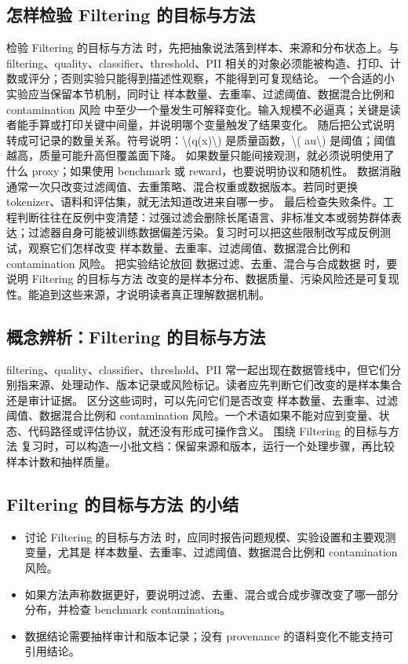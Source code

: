 \documentclass[a4paper]{article}
\begin{document}
\subsection{怎样检验 Filtering 的目标与方法}
检验 Filtering 的目标与方法 时，先把抽象说法落到样本、来源和分布状态上。与 filtering、quality、classifier、threshold、PII 相关的对象必须能被构造、打印、计数或评分；否则实验只能得到描述性观察，不能得到可复现结论。
一个合适的小实验应当保留本节机制，同时让 样本数量、去重率、过滤阈值、数据混合比例和 contamination 风险 中至少一个量发生可解释变化。输入规模不必逼真；关键是读者能手算或打印关键中间量，并说明哪个变量触发了结果变化。
随后把公式说明转成可记录的数量关系。符号说明：\textbackslash{}(q(x)\textbackslash{}) 是质量函数，\textbackslash{}( au\textbackslash{}) 是阈值；阈值越高，质量可能升高但覆盖面下降。 如果数量只能间接观测，就必须说明使用了什么 proxy；如果使用 benchmark 或 reward，也要说明协议和随机性。
数据消融通常一次只改变过滤阈值、去重策略、混合权重或数据版本。若同时更换 tokenizer、语料和评估集，就无法知道改进来自哪一步。
最后检查失败条件。工程判断往往在反例中变清楚：过强过滤会删除长尾语言、非标准文本或弱势群体表达；过滤器自身可能被训练数据偏差污染。复习时可以把这些限制改写成反例测试，观察它们怎样改变 样本数量、去重率、过滤阈值、数据混合比例和 contamination 风险。
把实验结论放回 数据过滤、去重、混合与合成数据 时，要说明 Filtering 的目标与方法 改变的是样本分布、数据质量、污染风险还是可复现性。能追到这些来源，才说明读者真正理解数据机制。
\subsection{概念辨析：Filtering 的目标与方法}
filtering、quality、classifier、threshold、PII 常一起出现在数据管线中，但它们分别指来源、处理动作、版本记录或风险标记。读者应先判断它们改变的是样本集合还是审计证据。
区分这些词时，可以先问它们是否改变 样本数量、去重率、过滤阈值、数据混合比例和 contamination 风险。一个术语如果不能对应到变量、状态、代码路径或评估协议，就还没有形成可操作含义。
围绕 Filtering 的目标与方法 复习时，可以构造一小批文档：保留来源和版本，运行一个处理步骤，再比较样本计数和抽样质量。
\subsection{Filtering 的目标与方法 的小结}
\begin{itemize}
\item 讨论 Filtering 的目标与方法 时，应同时报告问题规模、实验设置和主要观测变量，尤其是 样本数量、去重率、过滤阈值、数据混合比例和 contamination 风险。
\item 如果方法声称数据更好，要说明过滤、去重、混合或合成步骤改变了哪一部分分布，并检查 benchmark contamination。
\item 数据结论需要抽样审计和版本记录；没有 provenance 的语料变化不能支持可引用结论。
\end{itemize}
\end{document}
